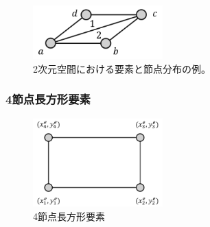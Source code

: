 \documentclass[dvipdfmx, 9pt, a4paper]{jsarticle}
\numberwithin{equation}{section}
\begin{document}
\begin{figure}[t]
\begin{center}
\includegraphics[width = 5cm]{fig1_2.png}
\caption{2次元空間における要素と節点分布の例。}
\end{center}
\end{figure}

\subsubsection{4節点長方形要素}
\begin{figure}[b]
\begin{center}
\includegraphics[width = 5cm]{fig1_4.png}
\caption{4節点長方形要素}
\end{center}
\end{figure}
\end{document}
